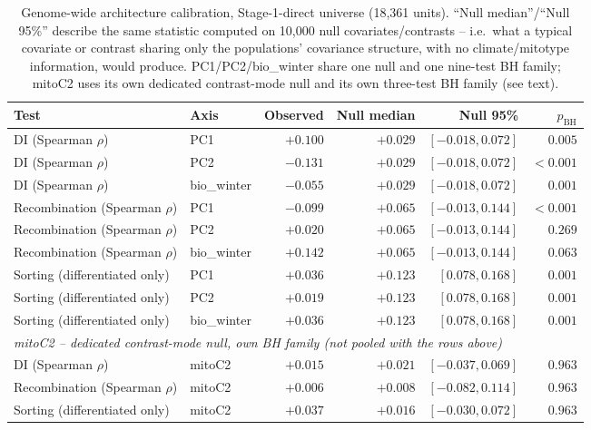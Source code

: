\documentclass[11pt]{article}
\begin{document}
\begin{table}[H]\centering\small
\begin{tabular}{llrrrr}
\toprule
Test & Axis & Observed & Null median & Null 95\% & $p_{\mathrm{BH}}$ \\
\midrule
DI (Spearman $\rho$)            & PC1         & $+0.100$ & $+0.029$ & $[-0.018, 0.072]$ & $0.005$ \\
DI (Spearman $\rho$)            & PC2         & $-0.131$ & $+0.029$ & $[-0.018, 0.072]$ & $<0.001$ \\
DI (Spearman $\rho$)            & bio\_winter & $-0.055$ & $+0.029$ & $[-0.018, 0.072]$ & $0.001$ \\
Recombination (Spearman $\rho$) & PC1         & $-0.099$ & $+0.065$ & $[-0.013, 0.144]$ & $<0.001$ \\
Recombination (Spearman $\rho$) & PC2         & $+0.020$ & $+0.065$ & $[-0.013, 0.144]$ & $0.269$ \\
Recombination (Spearman $\rho$) & bio\_winter & $+0.142$ & $+0.065$ & $[-0.013, 0.144]$ & $0.063$ \\
Sorting (differentiated only)   & PC1         & $+0.036$ & $+0.123$ & $[0.078, 0.168]$  & $0.001$ \\
Sorting (differentiated only)   & PC2         & $+0.019$ & $+0.123$ & $[0.078, 0.168]$  & $0.001$ \\
Sorting (differentiated only)   & bio\_winter & $+0.036$ & $+0.123$ & $[0.078, 0.168]$  & $0.001$ \\
\midrule
\multicolumn{6}{l}{\textit{mitoC2 -- dedicated contrast-mode null, own BH family (not pooled with the rows above)}} \\
\midrule
DI (Spearman $\rho$)            & mitoC2 & $+0.015$ & $+0.021$ & $[-0.037, 0.069]$ & $0.963$ \\
Recombination (Spearman $\rho$) & mitoC2 & $+0.006$ & $+0.008$ & $[-0.082, 0.114]$ & $0.963$ \\
Sorting (differentiated only)   & mitoC2 & $+0.037$ & $+0.016$ & $[-0.030, 0.072]$ & $0.963$ \\
\bottomrule
\end{tabular}
\caption{Genome-wide architecture calibration, Stage-1-direct universe (18{,}361 units).
``Null median''/``Null 95\%'' describe the same statistic computed on 10{,}000 null
covariates/contrasts -- i.e.\ what a typical covariate or contrast sharing only the
populations' covariance structure, with no climate/mitotype information, would produce.
PC1/PC2/bio\_winter share one null and one nine-test BH family; mitoC2 uses its own
dedicated contrast-mode null and its own three-test BH family (see text).}
\end{table}
\end{document}
